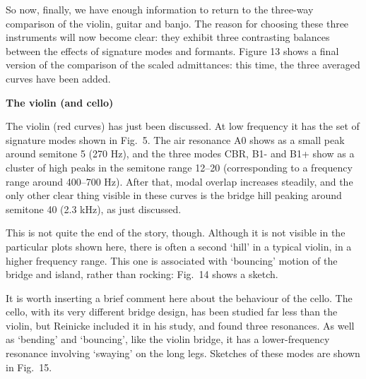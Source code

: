   So now, finally, we have enough information to return to the three-way 
  comparison of the violin, guitar and banjo. The reason for choosing these 
  three instruments will now become clear: they exhibit three contrasting 
  balances between the effects of signature modes and formants. Figure 13 shows 
  a final version of the comparison of the scaled admittances: this time, the 
  three averaged curves have been added. 


  \textbf{The violin (and cello)} 

  The violin (red curves) has just been discussed. At low frequency it has the 
  set of signature modes shown in Fig.\ 5. The air resonance A0 shows as a 
  small peak around semitone 5 (270 Hz), and the three modes CBR, B1- and B1+ 
  show as a cluster of high peaks in the semitone range 12--20 (corresponding 
  to a frequency range around 400--700 Hz). After that, modal overlap increases 
  steadily, and the only other clear thing visible in these curves is the 
  bridge hill peaking around semitone 40 (2.3 kHz), as just discussed. 

  This is not quite the end of the story, though. Although it is not visible in 
  the particular plots shown here, there is often a second `hill' in a typical 
  violin, in a higher frequency range. This one is associated with `bouncing' 
  motion of the bridge and island, rather than rocking: Fig.\ 14 shows a 
  sketch. 


  It is worth inserting a brief comment here about the behaviour of the cello. 
  The cello, with its very different bridge design, has been studied far less 
  than the violin, but Reinicke included it in his study, and found three 
  resonances. As well as `bending' and `bouncing', like the violin bridge, it 
  has a lower-frequency resonance involving `swaying' on the long legs. 
  Sketches of these modes are shown in Fig.\ 15. 



